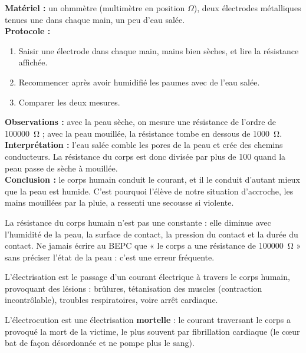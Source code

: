\documentclass[11pt]{article}
\newcommand{\cle}[1]{{\popxbold\color{popdark}#1}}
\newcounter{popsec}
\newcounter{popsub}
\newcommand{\courssub}[1]{%
  \stepcounter{popsub}%
  \par\vspace{9pt}\noindent{\popxbold\fontsize{11.5}{13}\selectfont\color{popink}{\color{poporange}\thepopsec.\thepopsub}\hspace{6pt}#1}\par\nopagebreak\vspace{4pt}
}
\begin{document}
\begin{experience}
\textbf{Matériel :} un ohmmètre (multimètre en position $\Omega$), deux électrodes métalliques tenues une dans chaque main, un peu d'eau salée.\\
\textbf{Protocole :}
\begin{enumerate}
\item Saisir une électrode dans chaque main, mains bien sèches, et lire la résistance affichée.
\item Recommencer après avoir humidifié les paumes avec de l'eau salée.
\item Comparer les deux mesures.
\end{enumerate}
\textbf{Observations :} avec la peau sèche, on mesure une résistance de l'ordre de \SI{100000}{\ohm} ; avec la peau mouillée, la résistance tombe en dessous de \SI{1000}{\ohm}.\\
\textbf{Interprétation :} l'eau salée comble les pores de la peau et crée des chemins conducteurs. La résistance du corps est donc divisée par plus de 100 quand la peau passe de sèche à mouillée.\\
\textbf{Conclusion :} le corps humain conduit le courant, et il le conduit d'autant mieux que la peau est humide. C'est pourquoi l'élève de notre situation d'accroche, les mains mouillées par la pluie, a ressenti une secousse si violente.
\end{experience}

\begin{attention}
La résistance du corps humain n'est pas une constante : elle diminue avec l'\cle{humidité} de la peau, la \cle{surface de contact}, la \cle{pression} du contact et la \cle{durée} du contact. Ne jamais écrire au BEPC que « le corps a une résistance de \SI{100000}{\ohm} » sans préciser l'état de la peau : c'est une erreur fréquente.
\end{attention}

\courssub{Électrisation et électrocution}

\begin{definition}[Électrisation]
L'\cle{électrisation} est le passage d'un courant électrique à travers le corps humain, provoquant des lésions : brûlures, tétanisation des muscles (contraction incontrôlable), troubles respiratoires, voire arrêt cardiaque.
\end{definition}

\begin{definition}[Électrocution]
L'\cle{électrocution} est une électrisation \textbf{mortelle} : le courant traversant le corps a provoqué la mort de la victime, le plus souvent par fibrillation cardiaque (le cœur bat de façon désordonnée et ne pompe plus le sang).
\end{definition}
\end{document}
